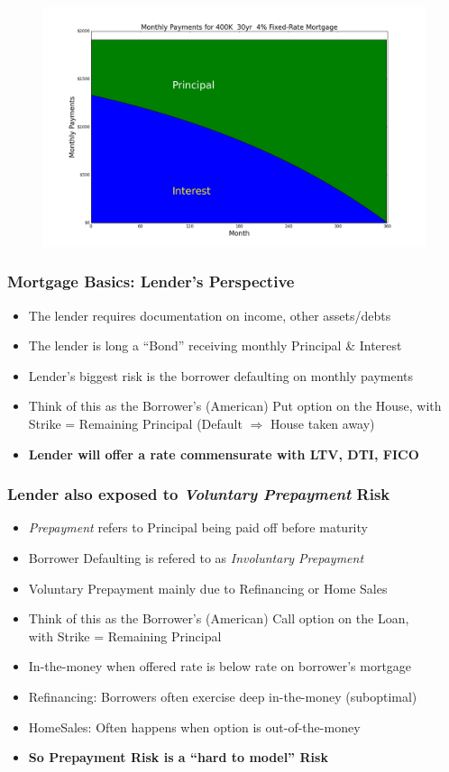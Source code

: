 \documentclass{beamer}
\begin{document}
\begin{frame}
\begin{figure}
\includegraphics[scale=0.32]{monthly_pni.png}
\end{figure}
\end{frame}

\begin{frame}
\frametitle{Mortgage Basics: Lender's Perspective}
\begin{itemize}
\item The lender requires documentation on income, other assets/debts
\item The lender is long a ``Bond'' receiving monthly Principal \& Interest
\item Lender's biggest risk is the borrower defaulting on monthly payments
\item Think of this as the Borrower's (American) Put option on the House, with Strike = Remaining Principal (Default $\Rightarrow$ House taken away)
\item {\bf Lender will offer a rate commensurate with LTV, DTI, FICO}
\end{itemize}
\end{frame}

\begin{frame}
\frametitle{Lender also exposed to {\em Voluntary Prepayment} Risk}
\begin{itemize}
\item {\em Prepayment} refers to Principal being paid off before maturity
\item Borrower Defaulting is refered to as {\em Involuntary Prepayment}
\item Voluntary Prepayment mainly due to Refinancing or Home Sales
\item Think of this as the Borrower's (American) Call option on the Loan, \\ with Strike = Remaining Principal
\item In-the-money when offered rate is below rate on borrower's mortgage
\item Refinancing: Borrowers often exercise deep in-the-money (suboptimal) 
\item HomeSales: Often happens when option is out-of-the-money
\item {\bf So Prepayment Risk is a ``hard to model'' Risk}
\end{itemize}
\end{frame}
\end{document}
